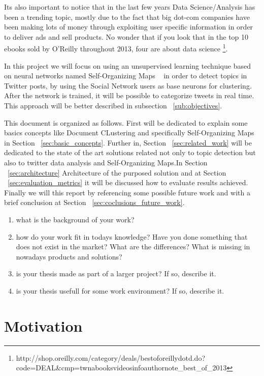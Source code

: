 Its also important to notice that in the last few years Data Science/Analysis has been a trending topic, mostly due to the fact that big dot-com companies have been making lots of money through exploiting user specific information in order to deliver ads and sell products. No wonder that if you look that in the top 10 ebooks sold by O'Reilly throughout 2013, four are about data science \footnote{http://shop.oreilly.com/category/deals/best\-of\-oreilly\-dotd.do?code=DEAL\&cmp=tw\-na\-books\-videos\-info\-authornote\_best\_of\_2013}.

In this project we will focus on using an unsupervised learning technique based on neural networks named Self-Organizing Maps ~\cite{Kohonen1990} in order to detect topics in Twitter posts, by using the Social Network users as base neurons for clustering. After the network is trained, it will be possible to categorize tweets in real time. This approach will be better described in subsection ~\ref{sub:objectives}.

This document is organized as follows. First will be dedicated to explain some basics concepts like Document CLustering and specifically Self-Organizing Maps in Section ~\ref{sec:basic_concepts}.  Further in, Section ~\ref{sec:related_work} will be dedicated to the state of the art solutions related not only to topic detection but also to twitter data analysis and Self-Organizing Maps.In Section ~\ref{sec:architecture} Architecture of the purposed solution and  at Section ~\ref{sec:evaluation_metrics} it will be discussed how to evaluate results achieved. Finally we will this report by referencing some possible future work and with a brief conclusion at Section ~\ref{sec:coclusions_future_work}.
 
\begin{enumerate}
 \item what is the background of your work?
 \item how do your work fit in todays knowledge? Have you done something that does not exist in the market? What are the differences? What is missing in nowadays products and solutions?
 \item is your thesis made as part of a larger project? If so, describe it.
 \item is your thesis usefull for some work environment? If so, describe it.
\end{enumerate}

\section{Motivation}

